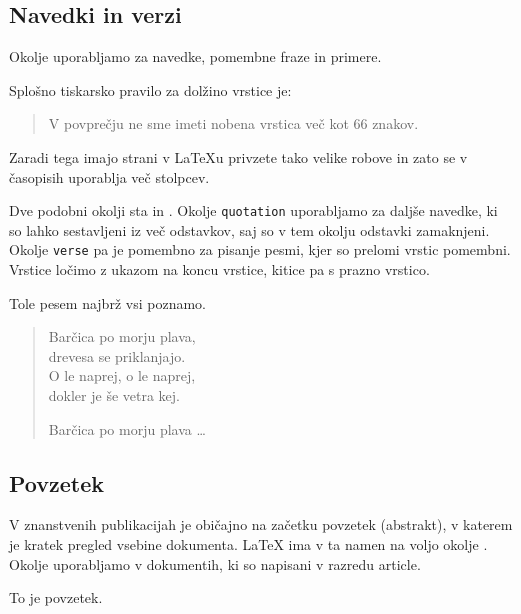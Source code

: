 \subsection{Navedki in verzi}

Okolje  uporabljamo za navedke, pomembne fraze in primere.

\begin{example}
Splošno tiskarsko pravilo za 
dolžino vrstice je:
\begin{quote}
V povprečju ne sme imeti nobena
vrstica več kot 66 znakov.
\end{quote}
Zaradi tega imajo strani v 
\LaTeX{}u privzete tako velike 
robove in zato se v časopisih 
uporablja več stolpcev.
\end{example}

Dve podobni okolji sta  in
. Okolje \texttt{quotation} uporabljamo za daljše navedke,
ki so lahko sestavljeni iz več odstavkov, saj so v tem okolju odstavki zamaknjeni.
Okolje \texttt{verse} pa je pomembno za pisanje pesmi, kjer so prelomi vrstic pomembni. 
Vrstice ločimo z ukazom \ci{\bs} na koncu vrstice, kitice pa s prazno vrstico.

\begin{example}
Tole pesem najbrž vsi poznamo.
\begin{flushleft}
\begin{verse}
Barčica po morju plava,\\
drevesa se priklanjajo.\\ 
O le naprej, o le naprej,\\
dokler je še vetra kej.

Barčica po morju plava \ldots
\end{verse}
\end{flushleft}
\end{example}

\subsection{Povzetek}

V znanstvenih publikacijah je običajno na začetku povzetek (abstrakt), v 
katerem je kratek pregled vsebine dokumenta. \LaTeX{} ima v ta namen na voljo okolje 
. Okolje  uporabljamo
v dokumentih, ki so napisani v razredu article.

\newenvironment{abstract}%
        {\begin{center}\begin{small}\begin{minipage}{0.8\textwidth}}%
        {\end{minipage}\end{small}\end{center}}
\begin{example}
\begin{abstract}
To je povzetek.
\end{abstract}
\end{example}


